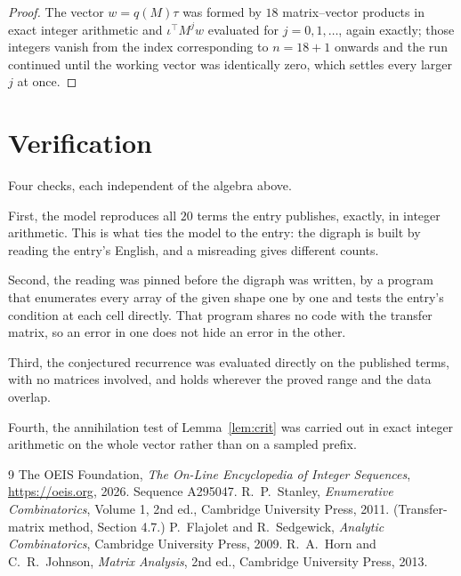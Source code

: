 \documentclass[11pt,a4paper]{article}
\theoremstyle{plain}
\theoremstyle{definition}
\begin{document}
\begin{proof}
The vector $w=q(M)\tau$ was formed by $18$ matrix--vector products in exact integer
arithmetic and $\iota^{\!\top}M^{j}w$ evaluated for $j=0,1,\dots$, again exactly; those
integers vanish from the index corresponding to $n=18+1$ onwards and the run continued
until the working vector was identically zero, which settles every larger $j$ at once.
\end{proof}

\section{Verification}

Four checks, each independent of the algebra above.

First, the model reproduces all $20$ terms the entry publishes, exactly, in integer
arithmetic. This is what ties the model to the entry: the digraph is built by reading the
entry's English, and a misreading gives different counts.

Second, the reading was pinned before the digraph was written, by a program that enumerates
every array of the given shape one by one and tests the entry's condition at each cell
directly. That program shares no code with the transfer matrix, so an error in one does not
hide an error in the other.

Third, the conjectured recurrence was evaluated directly on the published terms, with no
matrices involved, and holds wherever the proved range and the data overlap.

Fourth, the annihilation test of Lemma~\ref{lem:crit} was carried out in exact integer
arithmetic on the whole vector rather than on a sampled prefix.

\begin{thebibliography}{9}
 The OEIS Foundation, \emph{The On-Line Encyclopedia of Integer
Sequences}, \url{https://oeis.org}, 2026. Sequence A295047.
 R.~P.~Stanley, \emph{Enumerative Combinatorics}, Volume 1, 2nd ed.,
Cambridge University Press, 2011. (Transfer-matrix method, Section 4.7.)
 P.~Flajolet and R.~Sedgewick, \emph{Analytic Combinatorics}, Cambridge
University Press, 2009.
 R.~A.~Horn and C.~R.~Johnson, \emph{Matrix Analysis}, 2nd ed., Cambridge
University Press, 2013.
\end{thebibliography}
\end{document}

